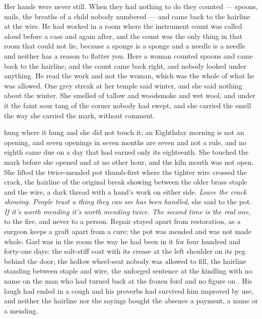 Her hands were never still. When they had nothing to do they counted --- spoons, nails, the breaths of a child nobody numbered --- and came back to the hairline at the wire. He had worked in a room where the instrument count was called aloud before a case and again after, and the count was the only thing in that room that could not lie, because a sponge is a sponge and a needle is a needle and neither has a reason to flatter you. Here a woman counted spoons and came back to the hairline, and the count came back right, and nobody looked under anything. He read the work and not the woman, which was the whole of what he was allowed. One grey streak at her temple said winter, and she said nothing about the winter. She smelled of tallow and woodsmoke and wet wool, and under it the faint sour tang of the corner nobody had swept, and she carried the smell the way she carried the mark, without comment.

 hung where it hung and she did not touch it; an Eighthday morning is not an opening, and seven openings in seven months are seven and not a rule, and no eighth came due on a day that had earned only its eighteenth. She touched the mark before she opened  and at no other hour, and the kiln mouth was not open. She lifted the twice-mended pot thumb-first where the tighter wire crossed the crack, the hairline of the original break showing between the older brass staple and the wire, a dark thread with a hand's work on either side. \emph{Leave the crack showing. People trust a thing they can see has been handled}, she said to the pot. \emph{If it's worth mending it's worth mending twice. The second time is the real one}, to the fire, and never to a person. Repair stayed apart from restoration, as a surgeon keeps a graft apart from a cure; the pot was mended and was not made whole. Garl was in the room the way he had been in it for four hundred and forty-one days: the salt-stiff coat with its crease at the left shoulder on its peg behind the door, the hollow wheel-seat nobody was allowed to fill, the hairline standing between staple and wire, the unforged sentence at the kindling with no name on the man who had turned back at the frozen ford and no figure on . His laugh had ended in a cough and his proverbs had survived him improved by use, and neither the hairline nor the sayings bought the absence a payment, a name or a mending.

